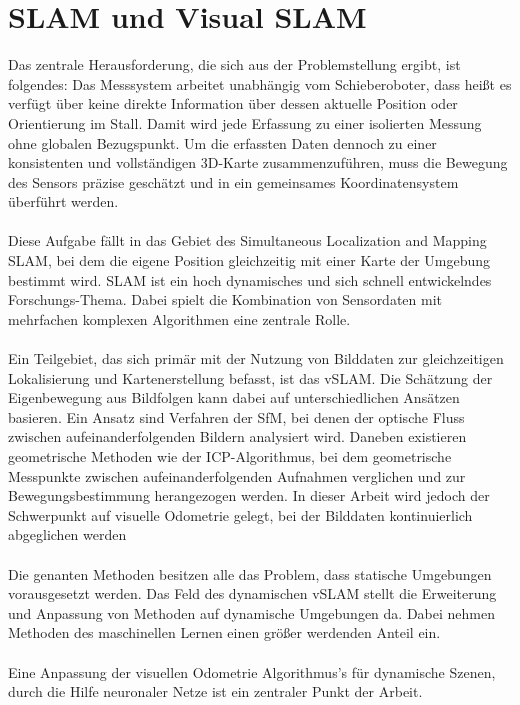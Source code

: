 \documentclass[12pt,DIV=15,BCOR=15mm,twoside,headsepline,abstract=true,listof=totoc,bibliography=totoc]{scrreprt}
\theoremstyle{remark}    %
\begin{document}
    \section{SLAM und Visual SLAM}
    Das zentrale Herausforderung, die sich aus der Problemstellung ergibt, ist folgendes:
    Das Messsystem arbeitet unabhängig vom Schieberoboter, dass heißt es verfügt über keine direkte Information über dessen aktuelle Position oder Orientierung im Stall.
    Damit wird jede Erfassung zu einer isolierten Messung ohne globalen Bezugspunkt.
    Um die erfassten Daten dennoch zu einer konsistenten und vollständigen 3D-Karte zusammenzuführen, muss die Bewegung des Sensors präzise geschätzt und in ein gemeinsames 
    Koordinatensystem überführt werden.\\\\
    Diese Aufgabe fällt in das Gebiet des Simultaneous Localization and Mapping \ac{SLAM}, bei dem die eigene Position gleichzeitig mit einer Karte der Umgebung 
    bestimmt wird. \ac{SLAM} ist ein hoch dynamisches und sich schnell entwickelndes Forschungs-Thema. Dabei spielt die Kombination von Sensordaten mit mehrfachen
    komplexen Algorithmen eine zentrale Rolle.\\\\
    Ein Teilgebiet, das sich primär mit der Nutzung von Bilddaten zur gleichzeitigen Lokalisierung und Kartenerstellung befasst, ist das \ac{vSLAM}.
    Die Schätzung der Eigenbewegung aus Bildfolgen kann dabei auf unterschiedlichen Ansätzen basieren.
    Ein Ansatz sind Verfahren der \ac{SfM}, bei denen der optische Fluss zwischen aufeinanderfolgenden Bildern analysiert wird.
    Daneben existieren geometrische Methoden wie der \ac{ICP}-Algorithmus, bei dem geometrische Messpunkte zwischen aufeinanderfolgenden Aufnahmen verglichen 
    und zur Bewegungsbestimmung herangezogen werden.
    In dieser Arbeit wird jedoch der Schwerpunkt auf visuelle Odometrie gelegt, bei der Bilddaten kontinuierlich abgeglichen werden \cite{10577209}\\\\
    Die genanten Methoden besitzen alle das Problem, dass statische Umgebungen vorausgesetzt werden. Das Feld des dynamischen \ac{vSLAM} stellt die Erweiterung 
    und Anpassung von Methoden auf dynamische Umgebungen da. Dabei nehmen Methoden des maschinellen Lernen einen größer werdenden Anteil ein.\cite{10577209}\\\\
    Eine Anpassung der visuellen Odometrie Algorithmus's für dynamische Szenen, durch die Hilfe neuronaler Netze ist ein zentraler Punkt der Arbeit.\\\\
\end{document}
